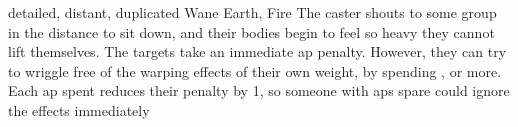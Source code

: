   {detailed, distant, duplicated}%
  {Wane}%
  {Earth, Fire}%
  {}%
  {
    The caster shouts to some group in the distance to sit down, and their bodies begin to feel so heavy they cannot lift themselves.
    The targets take an immediate  \gls{ap} penalty.
    However, they can try to wriggle free of the warping effects of their own weight, by spending , or more.
    Each \gls{ap} spent reduces their penalty by 1, so someone with  \glspl{ap} spare could ignore the effects immediately}%
  {}

